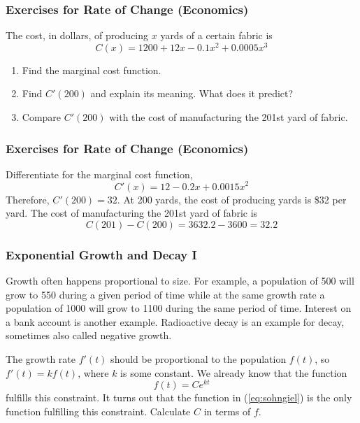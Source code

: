 \documentclass[xcolor=dvipsnames]{beamer}
\begin{document}
\begin{frame}
  \frametitle{Exercises for Rate of Change (Economics)}
The cost, in dollars, of producing $x$ yards of a certain fabric is
\begin{equation}
  \label{eq:uquuthae}
  C(x)=1200+12x-0.1x^{2}+0.0005x^{3}
\end{equation}
\begin{enumerate}
\item Find the marginal cost function.
\item Find $C'(200)$ and explain its meaning. What does it
  predict?
\item Compare $C'(200)$ with the cost of manufacturing the 201st
  yard of fabric.
\end{enumerate}
\end{frame}

\begin{frame}
  \frametitle{Exercises for Rate of Change (Economics)}
  Differentiate for the marginal cost function,
  \begin{equation}
    \label{eq:zingohlu}
    C'(x)=12-0.2x+0.0015x^{2}
  \end{equation}
Therefore, $C'(200)=32$. At 200 yards, the cost of producing yards is
\$32 per yard. The cost of manufacturing the 201st
yard of fabric is
\begin{equation}
  \label{eq:goozahsu}
  C(201)-C(200)=3632.2-3600=32.2
\end{equation}
\end{frame}

\begin{frame}
  \frametitle{Exponential Growth and Decay I}
  Growth often happens proportional to size. For example, a population
  of 500 will grow to 550 during a given period of time while at the
  same growth rate a population of 1000 will grow to 1100 during the
  same period of time. Interest on a bank account is another example.
  Radioactive decay is an example for decay, sometimes also called
  negative growth. 

\bigskip

The growth rate $f'(t)$ should be proportional to the population
$f(t)$, so $f'(t)=kf(t)$, where $k$ is some constant. We already know
that the function
\begin{equation}
  \label{eq:sohngiel}
  f(t)=Ce^{kt}
\end{equation}
fulfills this constraint. It turns out that the function in
(\ref{eq:sohngiel}) is the only function fulfilling this constraint.
Calculate $C$ in terms of $f$.
\end{frame}
\end{document}
